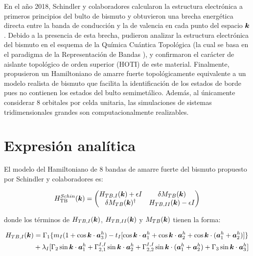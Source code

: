 \documentclass[
  letterpaper,
  DIV=11,
  numbers=noendperiod]{scrreprt}
\begin{document}
\[
\newcommand{\bk}{\boldsymbol{k}}
\newcommand{\baI}{\boldsymbol{a}_1}
\newcommand{\baII}{\boldsymbol{a}_2}
\newcommand{\baIII}{\boldsymbol{a}_3}
\]

En el año 2018, Schindler y colaboradores calcularon la estructura
electrónica a primeros principios del bulto de bismuto y obtuvieron una
brecha energética directa entre la banda de conducción y la de valencia
en cada punto del espacio \(\bk\). Debido a la presencia de esta brecha,
pudieron analizar la estructura electrónica del bismuto en el esquema de
la Química Cuántica Topológica \cite{Bradlyn2017} (la cual se basa en el
paradigma de la Representación de Bandas \cite{Cano2021}), y confirmaron
el carácter de aislante topológico de orden superior (HOTI) de este
material. Finalmente, propusieron un Hamiltoniano de amarre fuerte
topológicamente equivalente a un modelo realista de bismuto que facilita
la identificación de los estados de borde pues no contienen los estados
del bulto semimetálico. Además, al únicamente considerar 8 orbitales por
celda unitaria, las simulaciones de sistemas tridimensionales grandes
son computacionalmente realizables.

\hypertarget{expresiuxf3n-analuxedtica}{%
\section{Expresión analítica}\label{expresiuxf3n-analuxedtica}}

El modelo del Hamiltoniano de 8 bandas de amarre fuerte del bismuto
propuesto por Schindler y colaboradores \cite{Schindler2018} es:

\[
\begin{align}
    H_{\rm TB}^{Schin}(\bk) =
    \begin{pmatrix}
    H_{TB,I} (\bk) + \epsilon I & \delta M_{TB} (\bk)\\
    \delta M_{TB} (\bk)^\dagger & H_{TB,II} (\bk) - \epsilon I 
    \end{pmatrix}
\end{align}
\]

donde los términos de \(H_{TB,I} (\bk)\), \(H_{TB,II} (\bk)\) y
\(M_{TB} (\bk)\) tienen la forma:

\[
\begin{align}
    H_{TB,I} (\bk) &=
    \Gamma_1 \lbrace m_I(1+ \cos{\bk \cdot \baIII^h}) - t_I[\cos{\bk \cdot \baI^h} + \cos{\bk \cdot \baII^h} + \cos{\bk \cdot (\baI^h + \baII^h)}] \rbrace \nonumber \\ 
    & + \lambda_I [\Gamma_2 \sin{\bk \cdot \baI^h} + \Gamma_{2,1}^{I,I} \sin{\bk \cdot \baII^h} + \Gamma_{2,2}^{I,I} \sin{\bk \cdot (\baI^h+\baII^h)} + \Gamma_3 \sin \bk \cdot \baIII^h]
\end{align}
\]
\end{document}
